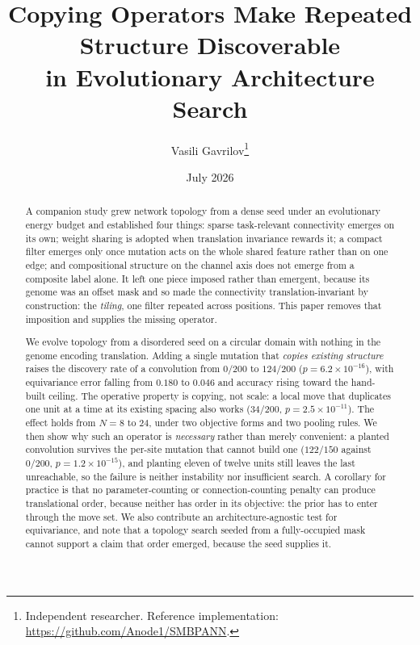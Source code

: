 \documentclass[11pt]{article}
\title{\textbf{Copying Operators Make Repeated Structure Discoverable\\
in Evolutionary Architecture Search}}
\author{Vasili Gavrilov\thanks{Independent researcher. Reference implementation:
\url{https://github.com/Anode1/SMBPANN}.}}
\date{July 2026}
\begin{document}
\maketitle

\begin{center}\end{center}

\begin{abstract}
A companion study grew network topology from a dense seed under an evolutionary energy budget and
established four things: sparse task-relevant connectivity emerges on its own; weight sharing is adopted
when translation invariance rewards it; a compact filter emerges only once mutation acts on the whole
shared feature rather than on one edge; and compositional structure on the channel axis does not emerge
from a composite label alone. It left one piece imposed rather than emergent, because its genome was an
offset mask and so made the connectivity translation-invariant by construction: the \emph{tiling}, one
filter repeated across positions. This paper removes that imposition and supplies the missing operator.

We evolve topology from a disordered seed on a circular domain with nothing in the genome encoding
translation. Adding a single mutation that \emph{copies existing structure} raises the discovery rate of
a convolution from $0/200$ to $124/200$ ($p = 6.2\times10^{-16}$), with equivariance error falling from
$0.180$ to $0.046$ and accuracy rising toward the hand-built ceiling. The operative property is copying,
not scale: a local move that duplicates one unit at a time at its existing spacing also works
($34/200$, $p = 2.5\times10^{-11}$). The effect holds from $N=8$ to $24$, under two objective forms and
two pooling rules. We then show why such an operator is \emph{necessary} rather than merely convenient:
a planted convolution survives the per-site mutation that cannot build one ($122/150$ against
$0/200$, $p = 1.2\times10^{-15}$), and planting eleven of twelve units still leaves the last unreachable,
so the failure is neither instability nor insufficient search. A corollary for practice is that no
parameter-counting or connection-counting penalty can produce translational order, because neither has
order in its objective: the prior has to enter through the move set. We also contribute an
architecture-agnostic test for equivariance, and note that a topology search seeded from a
fully-occupied mask cannot support a claim that order emerged, because the seed supplies it.
\end{abstract}
\end{document}
